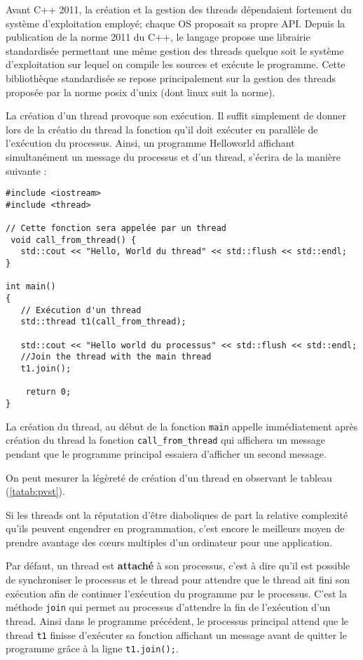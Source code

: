 \documentclass[fleqn,11pt]{article}
\begin{document}
Avant C++ 2011, la création et la gestion des threads dépendaient fortement du système d'exploitation employé; chaque OS proposait sa propre API. Depuis la publication de la norme 2011 du C++, le langage propose
une librairie standardisée permettant une même gestion des threads quelque soit le système d'exploitation
sur lequel on compile les sources et exécute le programme. Cette bibliothèque standardisée se repose
principalement sur la gestion des threads proposée par la norme posix d'unix (dont linux suit la norme).

La création d'un thread provoque son exécution. Il suffit simplement de donner lors de la créatio du thread
la fonction qu'il doit exécuter en parallèle de l'exécution du processus. Ainsi, un programme
Helloworld affichant simultanément un message du processus et d'un thread, s'écrira de la manière suivante :

\begin{lstlisting}
#include <iostream>
#include <thread>

// Cette fonction sera appelée par un thread
 void call_from_thread() {
   std::cout << "Hello, World du thread" << std::flush << std::endl;
}

int main()
{
   // Exécution d'un thread
   std::thread t1(call_from_thread);

   std::cout << "Hello world du processus" << std::flush << std::endl;
   //Join the thread with the main thread
   t1.join();

    return 0;
}
\end{lstlisting}

La création du thread, au début de la fonction \texttt{main} appelle immédiatement après création du thread
la fonction \texttt{call\_from\_thread} qui affichera un message pendant que le programme principal essaiera
d'afficher un second message.

On peut mesurer la légèreté de création d'un thread en observant le tableau (\ref{tatab:pvst}).

Si les threads ont la réputation d'être diaboliques de part la relative complexité
qu'ils peuvent engendrer en programmation, c'est encore le meilleurs moyen de prendre
avantage des c{\oe}urs multiples d'un ordinateur pour une application.

Par défaut, un thread est \textbf{attaché} à son processus, c'est à dire qu'il est
possible de synchroniser  le processus et le thread pour attendre que le thread ait fini son
exécution afin de continuer l'exécution du programme par le processus. C'est la méthode \texttt{join}
qui permet au processus d'attendre la fin de l'exécution d'un thread. Ainsi dans le programme précédent,
le processus principal attend que le thread \texttt{t1} finisse d'exécuter sa fonction affichant
un message avant de quitter le programme grâce à la ligne \lstinline{t1.join();}.
\end{document}
